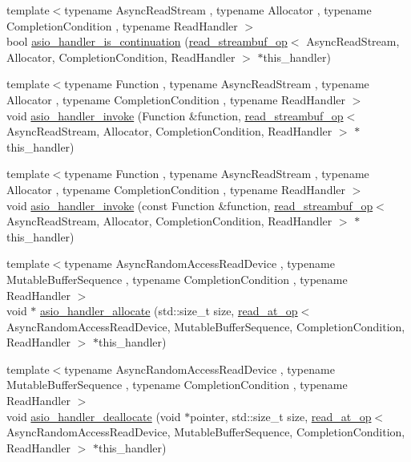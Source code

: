 \begin{DoxyCompactItemize}
\item 
{\footnotesize template$<$typename Async\+Read\+Stream , typename Allocator , typename Completion\+Condition , typename Read\+Handler $>$ }\\bool \hyperlink{namespaceasio_1_1detail_ac50192f773bec7c39bc0e899d5842e00}{asio\+\_\+handler\+\_\+is\+\_\+continuation} (\hyperlink{classasio_1_1detail_1_1read__streambuf__op}{read\+\_\+streambuf\+\_\+op}$<$ Async\+Read\+Stream, Allocator, Completion\+Condition, Read\+Handler $>$ $\ast$this\+\_\+handler)
\item 
{\footnotesize template$<$typename Function , typename Async\+Read\+Stream , typename Allocator , typename Completion\+Condition , typename Read\+Handler $>$ }\\void \hyperlink{namespaceasio_1_1detail_a2fc8dff00694547b54ed4fdec52f1a39}{asio\+\_\+handler\+\_\+invoke} (Function \&function, \hyperlink{classasio_1_1detail_1_1read__streambuf__op}{read\+\_\+streambuf\+\_\+op}$<$ Async\+Read\+Stream, Allocator, Completion\+Condition, Read\+Handler $>$ $\ast$this\+\_\+handler)
\item 
{\footnotesize template$<$typename Function , typename Async\+Read\+Stream , typename Allocator , typename Completion\+Condition , typename Read\+Handler $>$ }\\void \hyperlink{namespaceasio_1_1detail_ade85f6fe56e0e2894e1d9cb3d5f29588}{asio\+\_\+handler\+\_\+invoke} (const Function \&function, \hyperlink{classasio_1_1detail_1_1read__streambuf__op}{read\+\_\+streambuf\+\_\+op}$<$ Async\+Read\+Stream, Allocator, Completion\+Condition, Read\+Handler $>$ $\ast$this\+\_\+handler)
\item 
{\footnotesize template$<$typename Async\+Random\+Access\+Read\+Device , typename Mutable\+Buffer\+Sequence , typename Completion\+Condition , typename Read\+Handler $>$ }\\void $\ast$ \hyperlink{namespaceasio_1_1detail_a4aa16886154c7354abd3cedb6f30e2b2}{asio\+\_\+handler\+\_\+allocate} (std\+::size\+\_\+t size, \hyperlink{classasio_1_1detail_1_1read__at__op}{read\+\_\+at\+\_\+op}$<$ Async\+Random\+Access\+Read\+Device, Mutable\+Buffer\+Sequence, Completion\+Condition, Read\+Handler $>$ $\ast$this\+\_\+handler)
\item 
{\footnotesize template$<$typename Async\+Random\+Access\+Read\+Device , typename Mutable\+Buffer\+Sequence , typename Completion\+Condition , typename Read\+Handler $>$ }\\void \hyperlink{namespaceasio_1_1detail_ab82f9a3d82fefb9d123d8bce77d84359}{asio\+\_\+handler\+\_\+deallocate} (void $\ast$pointer, std\+::size\+\_\+t size, \hyperlink{classasio_1_1detail_1_1read__at__op}{read\+\_\+at\+\_\+op}$<$ Async\+Random\+Access\+Read\+Device, Mutable\+Buffer\+Sequence, Completion\+Condition, Read\+Handler $>$ $\ast$this\+\_\+handler)

\end{DoxyCompactItemize}
